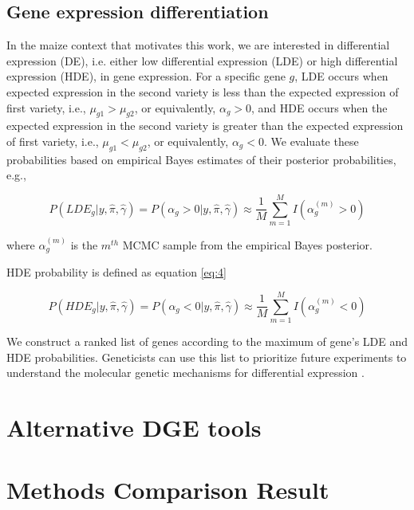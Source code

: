 \documentclass[11pt]{isuthesis}
\begin{document}
\subsection{Gene expression differentiation}

In the maize context that motivates this work, we are interested in differential expression (DE), i.e. either low differential expression (LDE) or high differential expression (HDE), in gene expression. For a specific gene $g$, LDE occurs when expected expression in the second variety is less than the expected expression of first variety, i.e., $\mu_{g1} > \mu_{g2}$, or equivalently, $\alpha_g>0$, and HDE occurs when the expected expression in the second variety is greater than the expected expression of first variety, i.e., $\mu_{g1} < \mu_{g2}$, or equivalently, $\alpha_g<0$. We evaluate these probabilities based on empirical Bayes estimates of their posterior probabilities, e.g., 

\begin{equation}
\label{eq:3}
P(LDE_g | y, \hat{\pi}, \hat{\gamma}) = P(\alpha_g>0 | y, \hat{\pi}, \hat{\gamma}) \approx \frac{1}{M} \sum_{m=1}^M I(\alpha_g ^ {(m)}>0)
\end{equation}

where $\alpha_g^{(m)}$ is the $m^{th}$ MCMC sample from the empirical Bayes posterior.

HDE probability is defined as equation \ref{eq:4}

\begin{equation}
\label{eq:4}
P(HDE_g | y, \hat{\pi}, \hat{\gamma}) = P(\alpha_g<0 | y, \hat{\pi}, \hat{\gamma}) \approx \frac{1}{M} \sum_{m=1}^M I(\alpha_g ^ {(m)}<0)
\end{equation}

We construct a ranked list of genes according to the maximum of gene's LDE and HDE probabilities. Geneticists can use this list to prioritize future experiments to understand the molecular genetic mechanisms for differential expression \cite{niemi2015empirical}. 

\section{Alternative DGE tools}



\section{Methods Comparison Result}
\end{document}
